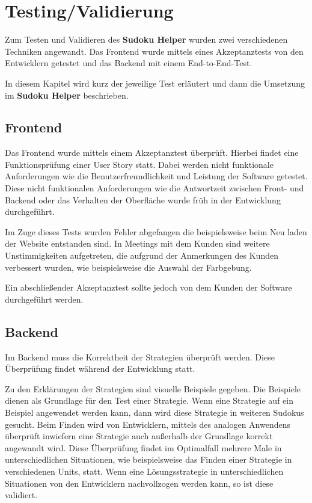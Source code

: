 
\chapter{Testing/Validierung}
Zum Testen und Validieren des \textbf{Sudoku Helper} wurden zwei verschiedenen Techniken angewandt. Das Frontend wurde mittels eines Akzeptanztests von den Entwicklern getestet und das Backend mit einem End-to-End-Test.

In diesem Kapitel wird kurz der jeweilige Test erläutert und dann die Umsetzung im \textbf{Sudoku Helper} beschrieben.

\section{Frontend}

Das Frontend wurde mittels einem Akzeptanztest überprüft. Hierbei findet eine Funktionsprüfung einer User Story statt. Dabei werden nicht funktionale Anforderungen wie die Benutzerfreundlichkeit und Leistung der Software getestet. Diese nicht funktionalen Anforderungen wie die Antwortzeit zwischen Front- und Backend oder das Verhalten der Oberfläche wurde früh in der Entwicklung durchgeführt.

Im Zuge dieses Tests wurden Fehler abgefangen die beispielsweise beim Neu laden der Website entstanden sind. In Meetings mit dem Kunden sind weitere Unstimmigkeiten aufgetreten, die aufgrund der Anmerkungen des Kunden verbessert wurden, wie beispielsweise die Auswahl der Farbgebung.

Ein abschließender Akzeptanztest sollte jedoch von dem Kunden der Software durchgeführt werden.

\section{Backend}

Im Backend muss die Korrektheit der Strategien überprüft werden. Diese Überprüfung findet während der Entwicklung statt. 

Zu den Erklärungen der Strategien sind visuelle Beispiele gegeben. Die Beispiele dienen als Grundlage für den Test einer Strategie. Wenn eine Strategie auf ein Beispiel angewendet werden kann, dann wird diese Strategie in weiteren Sudokus gesucht. Beim Finden wird von Entwicklern, mittels des analogen Anwendens überprüft inwiefern eine Strategie auch außerhalb der Grundlage korrekt angewandt wird. Diese Überprüfung findet im Optimalfall mehrere Male in unterschiedlichen Situationen, wie beispielsweise das Finden einer Strategie in verschiedenen Units, statt. Wenn eine Lösungsstrategie in unterschiedlichen Situationen von den Entwicklern nachvollzogen werden kann, so ist diese validiert.


